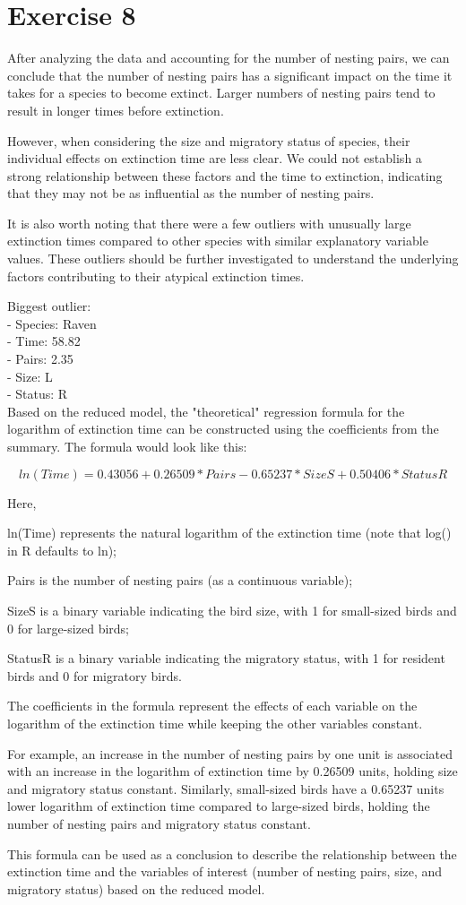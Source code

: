 \documentclass{article}
\begin{document}
\section{Exercise 8}

After analyzing the data and accounting for the number of nesting pairs,
we can conclude that the number of nesting pairs has a significant
impact on the time it takes for a species to become extinct. Larger
numbers of nesting pairs tend to result in longer times before
extinction.

However, when considering the size and migratory status of species,
their individual effects on extinction time are less clear. We could not
establish a strong relationship between these factors and the time to
extinction, indicating that they may not be as influential as the number
of nesting pairs.

It is also worth noting that there were a few outliers with unusually
large extinction times compared to other species with similar
explanatory variable values. These outliers should be further
investigated to understand the underlying factors contributing to their
atypical extinction times.

Biggest outlier: \\
- Species: Raven \\
- Time: 58.82 \\
- Pairs: 2.35 \\
- Size: L \\ 
- Status: R \\

Based on the reduced model, the "theoretical" regression formula for the
logarithm of extinction time can be constructed using the coefficients
from the summary. The formula would look like this:

$$ln(Time) = 0.43056 + 0.26509 * Pairs - 0.65237 * SizeS + 0.50406 *
StatusR$$

Here,

ln(Time) represents the natural logarithm of the extinction time (note
that log() in R defaults to ln);

Pairs is the number of nesting pairs (as a continuous variable);

SizeS is a binary variable indicating the bird size, with 1 for
small-sized birds and 0 for large-sized birds;

StatusR is a binary variable indicating the migratory status, with 1 for
resident birds and 0 for migratory birds.

The coefficients in the formula represent the effects of each variable
on the logarithm of the extinction time while keeping the other
variables constant.

For example, an increase in the number of nesting pairs by one unit is
associated with an increase in the logarithm of extinction time by
0.26509 units, holding size and migratory status constant. Similarly,
small-sized birds have a 0.65237 units lower logarithm of extinction
time compared to large-sized birds, holding the number of nesting pairs
and migratory status constant.

This formula can be used as a conclusion to describe the relationship
between the extinction time and the variables of interest (number of
nesting pairs, size, and migratory status) based on the reduced model.
\end{document}
